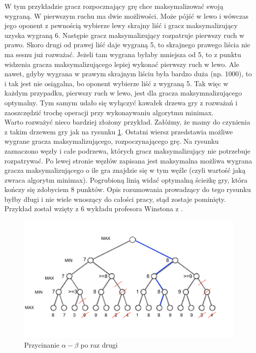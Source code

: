 \documentclass[licencjacka]{pracamgr}
\begin{document}
W tym przykładzie gracz rozpocznający grę chce maksymalizować swoją wygraną. W pierwszym ruchu ma dwie możliwości. Może pójść w lewo i wówczas jego oponent z pewnością wybierze lewy skrajny liść i gracz maksymalizujący uzyska wygraną 6. Następie gracz maksymalizujący rozpatruje pierwszy ruch w prawo. Skoro drugi od prawej liść daje wygraną 5, to skrajnego prawego liścia nie ma sesnu już rozważać. Jeżeli tam wygrana byłaby mniejsza od 5, to z punktu widzenia gracza maksymalizującego lepiej wykonać pierwszy ruch w lewo. Ale nawet, gdyby wygrana w prawym skrajnym liściu była bardzo duża (np. 1000), to i tak jest nie osiągalna, bo oponent wybierze liść z wygraną 5. Tak więc w każdym przypadku, pierwszy ruch w lewo, jest dla gracza maksymnalizującego optymalny. Tym samym udało się wyłączyć kawałek drzewa gry z rozważań i zaoszczędzić trochę  operacji przy wykonaywaniu algorytmu minimax. \\

Warto rozważyć nieco bardziej złożony przykład. Załóżmy, że mamy do czynienia z takim drzewem gry jak na rysunku \ref{Rys4}. Ostatni wiersz przedstawia możliwe wygrane gracza maksymalizującego, rozpoczynającego grę. Na rysunku zaznaczono węzły i całe podrzewa, których gracz maksymalizujący nie potrzebuje rozpatrywać. Po lewej stronie węzłów zapisana jest maksymalna możliwa wygrana gracza maksymalizującego o ile gra znajdzie się w tym węźle (czyli wartość jaką zwraca algorytm minimax). Pogrubioną linią widać optymalną ścieżkę gry, która kończy się zdobyciem 8 punktów. Opis rozumowania prowadzący do tego rysunku byłby długi i nie wiele wnoszący do całości pracy, stąd zostaje pominięty. Przykład został wzięty z 6 wykładu profesora Winstona z \cite{MIT_AI}.\\

\begin{figure}[h!]
	\includegraphics [scale=0.7] {big_tree2.png}
	\caption{Przycinanie $\alpha - \beta$ po raz drugi}
	\label{Rys4}
\end{figure}
\end{document}
